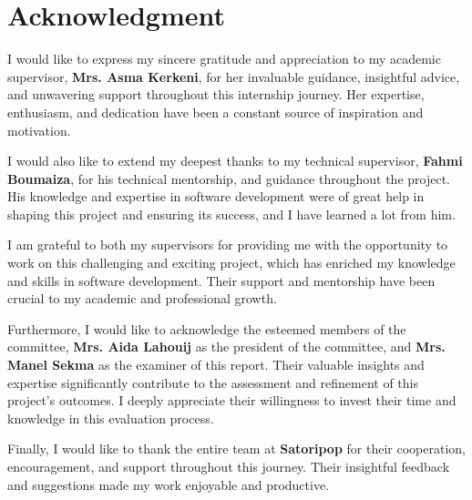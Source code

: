 \setcounter{page}{1}
\chapter*{Acknowledgment}

I would like to express my sincere gratitude and appreciation
to my academic supervisor, \textbf{Mrs. Asma Kerkeni}, for her invaluable guidance,
insightful advice, and unwavering support throughout this internship journey.
Her expertise, enthusiasm, and dedication have been a constant source
of inspiration and motivation.

I would also like to extend my deepest thanks to my technical supervisor,
\textbf{Fahmi Boumaiza}, for his technical mentorship, and guidance throughout
the project. His knowledge and expertise in software development were
of great help in shaping this project and ensuring its success,
and I have learned a lot from him.

I am grateful to both my supervisors for providing me with the opportunity
to work on this challenging and exciting project, which has enriched
my knowledge and skills in software development. Their support and mentorship
have been crucial to my academic and professional growth.

Furthermore, I would like to acknowledge the esteemed members of the committee,
\textbf{Mrs. Aida Lahouij} as the president of the committee, and \textbf{Mrs. Manel Sekma}
as the examiner of this report. Their valuable insights and expertise significantly contribute
to the assessment and refinement of this project's outcomes. I deeply appreciate their
willingness to invest their time and knowledge in this evaluation process.

Finally, I would like to thank the entire team at \textbf{Satoripop}
for their cooperation, encouragement, and support throughout this journey.
Their insightful feedback and suggestions made my work enjoyable and productive.